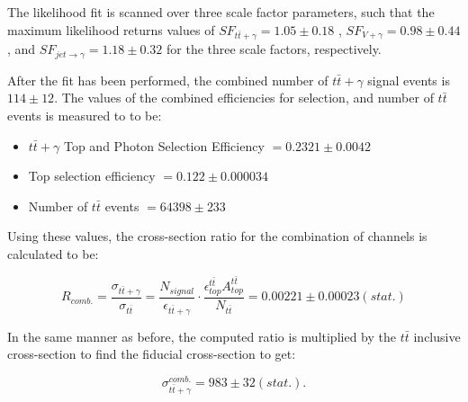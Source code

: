 The likelihood fit is scanned over three scale factor parameters, such that the maximum likelihood returns values of $SF_{t\bar{t}+\gamma} = 1.05 \pm 0.18$ , $SF_{V+\gamma} = 0.98 \pm 0.44$, and $SF_{jet\to\gamma} = 1.18 \pm 0.32$  for the three scale factors, respectively.



After the fit has been performed, the combined number of $t\bar{t}+\gamma$ signal events is $114 \pm 12$. The values of the combined efficiencies for selection, and number of $t\bar{t}$ events is measured to to be:

\begin{itemize}
	\item $t\bar{t}+\gamma$ Top and Photon Selection Efficiency $= 0.2321 \pm 0.0042$
	\item Top selection efficiency $= 0.122 \pm 0.000034$
	\item Number of $t\bar{t}$ events $= 64398 \pm 233$
\end{itemize}


Using these values, the cross-section ratio for the combination of channels is calculated to be:

\begin{equation}
	R_{comb.} = \frac{\sigma_{t\bar{t}+\gamma}}{\sigma_{t\bar{t}}} = \frac{N_{signal}}{\epsilon_{t\bar{t}+\gamma}} \cdot \frac{\epsilon^{t\bar{t}}_{top} A^{t\bar{t}}_{top}}{N_{t\bar{t}}} = 0.00221 \pm 0.00023 (stat.)
\end{equation}

In the same manner as before, the computed ratio is multiplied by the $t\bar{t}$ inclusive cross-section to find the fiducial cross-section to get:

\begin{equation}
	\sigma_{t\bar{t}+\gamma}^{comb.} = 983 \pm 32 (stat.).
\end{equation}

